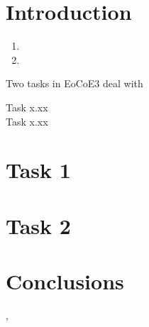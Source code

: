 \documentclass[a4paper,12pt]{article}
\begin{document}
\section{Introduction}

\lipsum[1]
\begin{enumerate}
\item \lipsum[1]
\item \lipsum[2]
\end{enumerate}
Two tasks in EoCoE3 deal with 
\begin{description}
\item[Task x.xx] \lipsum[4]
\item[Task x.xx] \lipsum[5]
\end{description}
\lipsum[6-8]
\clearpage

\section{Task 1}

%

%




\section{Task 2}
%

%


\section{Conclusions}

\cite{MR1928068}, \cite{shannon}

\clearpage
\printbibliography
\end{document}
